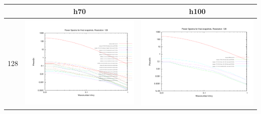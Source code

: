 \documentclass[a4paper,11pt,fleqn,oneside]{book}
\begin{document}
\begin{itemize}
\begin{table}
\begin{tabular}{l|c|c}
 \end{tabular}
\end{table}

\begin{table}
\begin{tabular}{l|c|c}
 & h70 & h100 \\
\hline 
 128 & \includegraphics[scale=0.2]{analysis/powerspectra/fin_powspec_combined_128_h70.pdf} & \includegraphics[scale=0.2]{analysis/powerspectra/fin_powspec_combined_128_h100.pdf} \\

\end{tabular}
\end{table}
\end{itemize}
\end{document}
